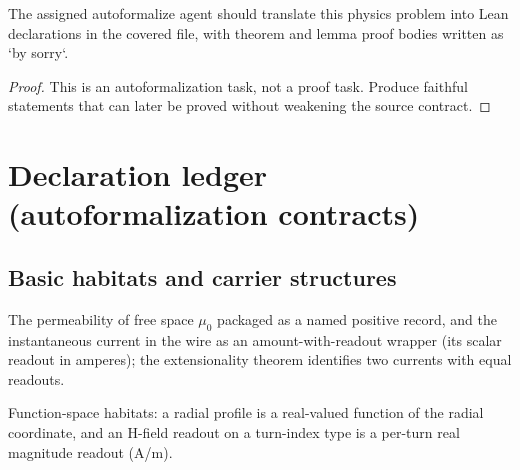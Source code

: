 \begin{theorem}
\label{thm:physics:IPhO_2026_3_A_1:target}
The assigned autoformalize agent should translate this physics problem into Lean declarations in the covered file, with theorem and lemma proof bodies written as `by sorry`.
\end{theorem}
\begin{proof}
This is an autoformalization task, not a proof task. Produce faithful statements that can later be proved without weakening the source contract.
\end{proof}


\section*{Declaration ledger (autoformalization contracts)}

\subsection*{Basic habitats and carrier structures}

\begin{definition}
\label{def:IPhO2026Problems_problem_IPhO_2026_3_A_1:FreeSpace}
The permeability of free space $\mu_0$ packaged as a named positive record,
and the instantaneous current in the wire as an amount-with-readout wrapper
(its scalar readout in amperes); the extensionality theorem identifies two
currents with equal readouts.
\end{definition}

\begin{definition}
\label{def:IPhO2026Problems_problem_IPhO_2026_3_A_1:RadialProfile}
Function-space habitats: a radial profile is a real-valued function of the
radial coordinate, and an H-field readout on a turn-index type is a
per-turn real magnitude readout (A/m).
\end{definition}

